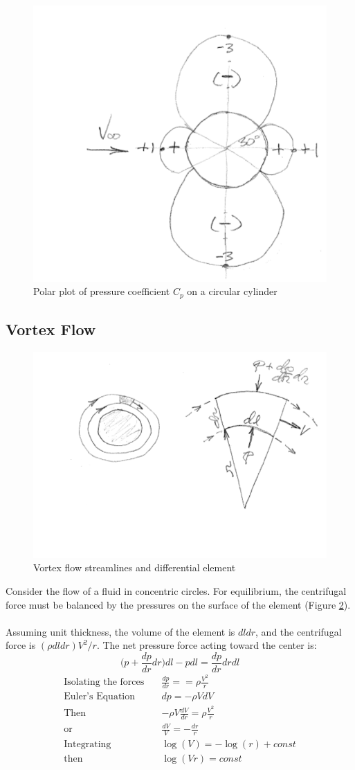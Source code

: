 \documentclass[draft=false, titlepage]{article}
\begin{document}
\begin{figure}[ht]
    \centering
    \includegraphics[width=0.3\linewidth]{Figures/CpOnCylinder.PNG}
    \caption{Polar plot of pressure coefficient $C_p$ on a circular cylinder}
    \label{fig:CpCircularCylinder}
\end{figure}


\subsection{Vortex Flow}
\begin{figure}[ht]
    \centering
    \includegraphics[width=0.3\linewidth]{Figures/vortexFlow.PNG}
    \caption{Vortex flow streamlines and differential element}
    \label{fig:VortexFlow}
\end{figure}

Consider the flow of a fluid in concentric circles. For equilibrium, the centrifugal force must be balanced by the pressures on the surface of the element (Figure \ref{fig:VortexFlow}).
\paragraph*{} Assuming unit thickness, the volume of the element is $dldr$, and the centrifugal force is $(\rho dldr) V^2/r$. The net pressure force acting toward the center is:
\begin{equation*}
    \big( p+ \frac{dp}{dr}dr \big) dl - pdl = \frac{dp}{dr}drdl
\end{equation*}
\begin{align*}
    \text{Isolating the forces} \quad &
    \frac{dp}{dr} = =\rho \frac{V^2}{r}\\
    \text{Euler's Equation} \quad &
    dp = -\rho VdV\\
    \text{Then} \quad & -\rho V \frac{dV}{dr} = \rho \frac{V^2}{r}\\
    \text{or} \quad & \frac{dV}{V} = -\frac{dr}{r}\\
    \text{Integrating} \quad & \log(V) = -\log(r) + const\\
    \text{then} \quad & \log(Vr) = const
\end{align*}
\end{document}
